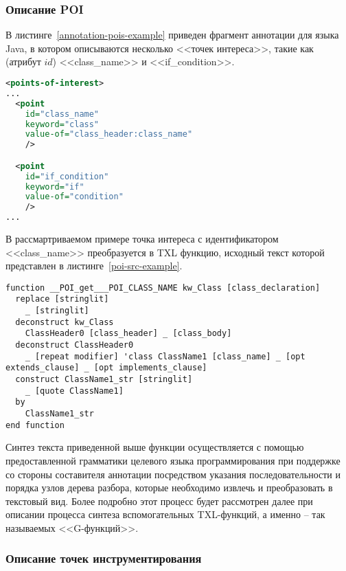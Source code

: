 \subsubsection{Описание POI}

В листинге~\ref{annotation-pois-example} приведен фрагмент аннотации для языка Java, в котором описываются несколько <<точек интереса>>, такие как (атрибут $id$) <<class\_name>> и <<if\_condition>>.

\begin{lstlisting}[frame=single, language=XML, label={annotation-pois-example}, caption={Пример описания <<точек интереса>>.}]
<points-of-interest>
...
  <point
    id="class_name"
    keyword="class"
    value-of="class_header:class_name"
    />

  <point
    id="if_condition"
    keyword="if"
    value-of="condition"
    />
...
\end{lstlisting}

В рассмартриваемом примере точка интереса с идентификатором <<class\_name>> преобразуется в TXL функцию, исходный текст которой представлен в листинге~\ref{poi-src-example}.

\begin{lstlisting}[frame=single, language=TXL, label={poi-src-example}, caption={Пример синтезированной функции для точки интереса <<class\_name>>.}]
function __POI_get___POI_CLASS_NAME kw_Class [class_declaration]
  replace [stringlit]
    _ [stringlit]
  deconstruct kw_Class
    ClassHeader0 [class_header] _ [class_body]
  deconstruct ClassHeader0
    _ [repeat modifier] 'class ClassName1 [class_name] _ [opt extends_clause] _ [opt implements_clause]
  construct ClassName1_str [stringlit]
    _ [quote ClassName1]
  by
    ClassName1_str
end function
\end{lstlisting}

Синтез текста приведенной выше функции осуществляется с помощью предоставленной грамматики целевого языка программирования при поддержке со стороны составителя аннотации посредством указания последовательности и порядка узлов дерева разбора, которые необходимо извлечь и преобразовать в текстовый вид.
Более подробно этот процесс будет рассмотрен далее при описании процесса синтеза вспомогательных TXL-функций, а именно -- так называемых <<G-функций>>.

\subsubsection{Описание точек инструментирования}


